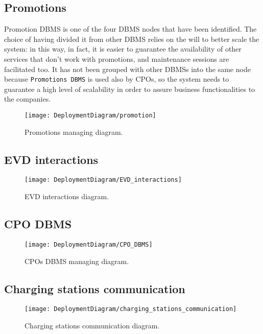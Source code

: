 \subsection{Promotions}
\label{subsec:promotions}%
Promotion DBMS is one of the four DBMS nodes that have been identified.
The choice of having divided it from other DBMS relies on the will to better scale the system:
in this way, in fact, it is easier to guarantee the availability
of other services that don't work with promotions, and maintenance sessions are facilitated too.
It has not been grouped with other DBMSs into the same node because \verb|Promotions DBMS| is used also by CPOs,
so the system needs to guarantee a high level of scalability in order to assure business functionalities to the companies.
\begin{figure} [H]
    \begin{center}
        \texttt{[image: DeploymentDiagram/promotion]}
        \caption{Promotions managing diagram.}
        \label{fig: promotion}
    \end{center}
\end{figure}

\subsection{EVD interactions}
\label{subsec:evd_interactions}%
\begin{figure} [H]
    \begin{center}
        \texttt{[image: DeploymentDiagram/EVD\_interactions]}
        \caption{EVD interactions diagram.}
        \label{fig: evd_interactions}
    \end{center}
\end{figure}

\subsection{CPO DBMS}
\label{subsec:cpo_dbms}%
\begin{figure} [H]
    \begin{center}
        \texttt{[image: DeploymentDiagram/CPO\_DBMS]}
        \caption{CPOs DBMS managing diagram.}
        \label{fig: cpo_dbms}
    \end{center}
\end{figure}

\subsection{Charging stations communication}
\label{subsec:charging_stations_communication}%
\begin{figure} [H]
    \begin{center}
        \texttt{[image: DeploymentDiagram/charging\_stations\_communication]}
        \caption{Charging stations communication diagram.}
        \label{fig: charing_stations_dbms}
    \end{center}
\end{figure}

